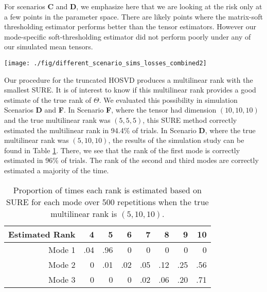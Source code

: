  For scenarios \textbf{C} and \textbf{D}, we emphasize here that we
are looking at the risk only at a few points in the parameter
space. There are likely points where the matrix-soft thresholding
estimator performs better than the tensor estimators. However our mode-specific
soft-thresholding estimator did not perform poorly under any of our simulated mean tensors.


\begin{figure*}
\begin{center}
\texttt{[image: ./fig/different\_scenario\_sims\_losses\_combined2]}
\caption{Box plots of losses for the six estimators under different scenarios. The estimators include the mode-specific soft-thresholding (ST), truncated HOSVD (Tr), matrix soft-thresholding (MS), Efron-Morris (EM), James-Stein (JS), and maximum likelihood (X) estimators. In the scenarios, the mean tensor was simulated to have (\textbf{A}) uncorrelated elements, (\textbf{B}) full rank but dispersed singular values only along mode 1, (\textbf{C}) AR-1 covariance along mode 1, (\textbf{D}) low rank only along mode 1, (\textbf{E}) full rank but dispersed singular values along all modes, and (\textbf{F}) rank $(5,5,5)$ with all the same non-zero singular values.}
\label{fig:sim.results}
\end{center}
\end{figure*}

Our procedure for the truncated HOSVD produces a multilinear rank with the smallest SURE. It is of interest to know if this multilinear rank provides a good estimate of the true rank of $\Theta$. We evaluated this possibility in simulation Scenarios \textbf{D} and \textbf{F}. In Scenario \textbf{F}, where the tensor had dimension $(10,10,10)$ and the true multilinear rank was $(5,5,5)$, this SURE method correctly estimated the multilinear rank in 94.4\% of trials. In Scenario \textbf{D}, where the true multilinear rank was $(5,10,10)$, the results of the simulation study can be found in Table \ref{tab:rank.est}. There, we see that the rank of the first mode is correctly estimated in 96\% of trials. The rank of the second and third modes are correctly estimated a majority of the time.

\begin{table}[ht]
\centering
\begin{tabular}{rrrrrrrr}
  \hline
Estimated Rank & 4 & 5 & 6 & 7 & 8 & 9 & 10 \\ 
  \hline
Mode 1 & .04 & .96 & 0 & 0 & 0 & 0 & 0 \\ 
Mode 2 &   0 & .01 & .02 & .05 & .12 & .25 & .56 \\ 
Mode 3 &   0 & 0 & 0 & .02 & .06 & .20 & .71 \\ 
   \hline
\end{tabular}
\caption{Proportion of times each rank is estimated based on SURE for each mode over 500 repetitions when the true multilinear rank is $(5,10,10)$.}
\label{tab:rank.est}
\end{table}

